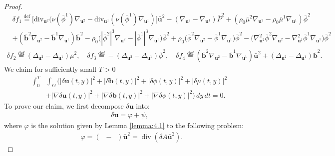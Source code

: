 \documentclass[11pt]{article}
\numberwithin{equation}{section}
\begin{document}
\begin{proof}
\begin{align*}
&\delta f_1 \stackrel{\text{def}}{=} \big[ \mathrm{div}_{\mathbf{u}^2} (\nu(\bar{\phi}^1) \nabla _{\mathbf{u}^2} - \mathrm{div}_{\mathbf{u}^1}(\nu(\bar{\phi}^1) \nabla_{\mathbf{u}^1}) \big] \bar{\mathbf{u}}^2 - (\nabla_{\mathbf{u}^2} - \nabla_{\mathbf{u}^1}) \bar{P}^2 + (\rho_0 \bar{\mu}^2 \nabla_{\mathbf{u}^2} - \rho_0 \bar{\mu}^1 \nabla_{\mathbf{u}^1}) \bar{\phi}^2\\
&+(\bar{\mathbf{b}}^2 \nabla_{\mathbf{u}^2}-\bar{\mathbf{b}}^1 \nabla_{\mathbf{u}^1})\bar{\mathbf{b}}^2 - \rho_0 \big( |\bar{\phi}^2|^3 \nabla_{\mathbf{u}^2} - |\bar{\phi}^1|^3 \nabla_{\mathbf{u}^1} \big) \bar{\phi}^2 + \rho_0 \big( \bar{\phi}^2 \nabla_{\mathbf{u}^2} - \bar{\phi}^1 \nabla_{\mathbf{u}^1}\big) \bar{\phi}^2 - \big( \nabla^2_{\mathbf{u}^2} \bar{\phi}^2 \nabla_{\mathbf{u}^2} - \nabla^2_{\mathbf{u}^1} \bar{\phi}^1 \nabla_{\mathbf{u}^1}\big) \bar{\phi}^2
\end{align*}
\begin{align*}
\delta f_2 \stackrel{\text{def}}{=} (\Delta_{\mathbf{u}^2} - \Delta_{\mathbf{u}^1}) \bar{\mu}^2, \quad \delta f_3 \stackrel{\text{def}}{=} -(\Delta_{\mathbf{u}^2} - \Delta_{\mathbf{u}^1}) \bar{\phi}^2,  \quad \delta f_4 \stackrel{\text{def}}{=} (\bar{\mathbf{b}}^2 \nabla_{\mathbf{u}^2}-\bar{\mathbf{b}}^1 \nabla_{\mathbf{u}^1})\bar{\mathbf{u}}^2+(\Delta_{\mathbf{u}^2} - \Delta_{\mathbf{u}^1}) \bar{\mathbf{b}}^2.
\end{align*}
We claim for sufficiently small \( T > 0 \)
\begin{equation*}
\begin{split}
\int_0^T &\int_{\Omega} \bigl(|\delta \mathbf{u}(t, y)|^2 +|\delta \mathbf{b}(t, y)|^2 +  |\delta \phi(t, y)|^2+|\delta \mu(t, y)|^2 \\&+ |\nabla \delta \mathbf{u}(t, y)|^2 +|\nabla \delta \mathbf{b}(t, y)|^2  + |\nabla \delta \phi(t, y)|^2\bigr) \, dy \, dt = 0.
\end{split}
\end{equation*}
To prove our claim, we first decompose \( \delta \mathbf{u} \) into:
\begin{align}
\delta \mathbf{u} = \varphi + \psi,
\end{align}
where \( \varphi \) is the solution given by Lemma \ref{lemma:4.1} to the following problem:
\begin{align}
\mathop{\mathrm{div}_{\mathbf{u}^1}} \varphi = (\mathop{\mathrm{div}_{\mathbf{u}^1}} - \mathop{\mathrm{div}_{\mathbf{u}^2}}) \bar{\mathbf{u}}^2 \nonumber= \mathop{\mathrm{div}}(\delta A \bar{\mathbf{u}}^2).
\end{align}

\end{proof}
\end{document}
